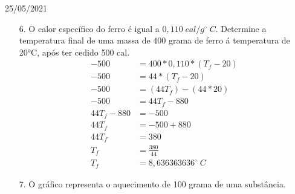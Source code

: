 \documentclass{SchoolBook}
\begin{document}
    \begin{day}{25/05/2021}
        \begin{enumerate}
            \item[6.] O calor específico do ferro é igual a $ 0,110\;cal/g^\circ\;C $. Determine a temperatura final de uma massa de 400 grama de ferro á temperatura de 20°C, após ter cedido 500 cal.
            \begin{align*}
                -500 &= 400 * 0,110 * (T_f - 20) \\
                -500 &= 44 * (T_f - 20) \\
                -500 &= (44 T_f) - (44 * 20) \\
                -500 &= 44 T_f - 880 \\
                44 T_f - 880 &= -500 \\
                44 T_f &= -500 + 880 \\
                44 T_f &= 380 \\
                T_f &= \frac{380}{44} \\
                T_f &= 8,636363636^\circ\;C
            \end{align*}
            
            \item[7.] O gráfico representa o aquecimento de 100 grama de uma substância.
            

\end{enumerate}
\end{day}
\end{document}
